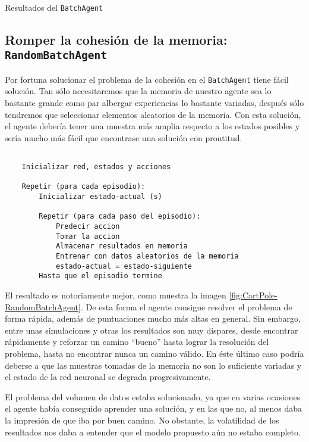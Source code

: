 %
       {Resultados del \texttt{BatchAgent}}


\subsection{Romper la cohesión de la memoria: \texttt{RandomBatchAgent}}

Por fortuna solucionar el problema de la cohesión en el \texttt{BatchAgent} tiene fácil solución. Tan sólo necesitaremos que la memoria de nuestro agente sea lo bastante grande como par albergar experiencias lo bastante variadas, después sólo tendremos que seleccionar elementos aleatorios de la memoria. Con esta solución, el agente debería tener una muestra más amplia respecto a los estados posibles y sería mucho más fácil que encontrase una solución con prontitud.

\begin{minipage}{0.9\linewidth}%
    \begin{lstlisting}[frame=tb, caption=Pseudocódigo RandomBatchAgent, inputencoding=latin1, label=code:cartpole_drl3]
    
    Inicializar red, estados y acciones
    
    Repetir (para cada episodio):
        Inicializar estado-actual (s)
        
        Repetir (para cada paso del episodio):
            Predecir accion
            Tomar la accion
            Almacenar resultados en memoria
            Entrenar con datos aleatorios de la memoria
            estado-actual = estado-siguiente
        Hasta que el episodio termine
    \end{lstlisting}%
\end{minipage}

El resultado es notoriamente mejor, como muestra la imagen \ref{fig:CartPole-RandomBatchAgent}. De esta forma el agente consigue resolver el problema de forma rápida, además de puntuaciones mucho más altas en general. Sin embargo, entre unas simulaciones y otras los resultados son muy dispares, desde encontrar rápidamente y reforzar un camino ``bueno'' hasta lograr la resolución del problema, hasta no encontrar nunca un camino válido. En éste último caso podría deberse a que las muestras tomadas de la memoria no son lo suficiente variadas y el estado de la red neuronal se degrada progresivamente.

El problema del volumen de datos estaba solucionado, ya que en varias ocasiones el agente había conseguido aprender una solución, y en las que no, al menos daba la impresión de que iba por buen camino. No obstante, la volatilidad de los resultados nos daba a entender que el modelo propuesto aún no estaba completo.

